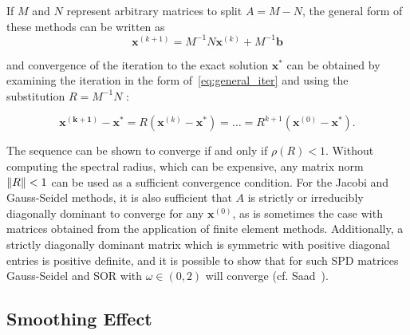 
If $M$ and $N$ represent arbitrary matrices to split $A = M - N$, the general form of these methods can be written as
\begin{equation}
	\mathbf{x}^{(k+1)} = M^{-1}N\mathbf{x}^{(k)} + M^{-1}\mathbf{b}
	\label{eq:general_iter}
\end{equation}

and convergence of the iteration to the exact solution $\mathbf{x}^*$ can be obtained by examining the iteration in the form of~\ref{eq:general_iter} and using the substitution $R = M^{-1}N $ :

\begin{equation}
	\mathbf{x^{(k+1)}} - \mathbf{x}^* = R\left(\mathbf{x}^{(k)} - \mathbf{x}^* \right) = \ldots = R^{k+1}\left(\mathbf{x}^{(0)} - \mathbf{x}^* \right).
\end{equation}


The sequence can be shown to converge if and only if $\rho\left( R \right) < 1$. Without computing the spectral radius, which can be expensive, any matrix norm $\left\lVert R\right\rVert < 1$ can be used as a sufficient convergence condition. For the Jacobi and Gauss-Seidel methods, it is also sufficient that $A$ is strictly or irreducibly diagonally dominant to converge for any $\mathbf{x}^{(0)}$, as is sometimes the case with matrices obtained from the application of finite element methods. Additionally, a strictly diagonally dominant matrix which is symmetric with positive diagonal entries is positive definite, and it is possible to show that for such SPD matrices Gauss-Seidel and SOR with $\omega \in (0, 2)$ will converge (cf. Saad~\cite{Saad2003}).


%

\subsection{Smoothing Effect}

